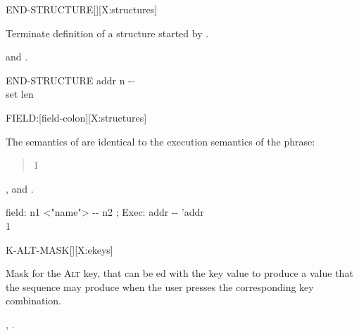 \begin{worddef}{}{END-STRUCTURE}[][X:structures]
\item {}

	Terminate definition of a structure started by
	.

\see {} and
	.

	\begin{implement} %

		\word{:} END-STRUCTURE\tab{} addr n -{}- \\
		\tab {} \word{!} \word{;} \tab[4.2] set len
	\end{implement}
\end{worddef}


\begin{worddef}{}{FIELD:}[field-colon][X:structures]
\item \stack{}{}

	The semantics of  are identical to the
	execution semantics of the phrase:
	\begin{quote}\ttfamily
		 1  
	\end{quote}

\see {},
	 and
	.

	\begin{implement} %

		\word{:} field:\tab{} n1 <"name"> -{}- n2 ; Exec: addr -{}- 'addr \\
		\tab {} 1   \\
		\word{;}
	\end{implement}
\end{worddef}


\begin{worddef}{}{K-ALT-MASK}[][X:ekeys]
\item {}

	Mask for the \textsc{Alt} key, that can be ed with the
	key value to produce a value that the sequence 
	 may produce when the user presses the
	corresponding key combination.

\see {},
	.
\end{worddef}


